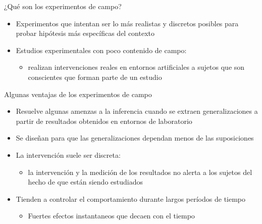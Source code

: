\documentclass[
  ignorenonframetext,
]{beamer}
\providecommand{\tightlist}{%
  \setlength{\itemsep}{0pt}\setlength{\parskip}{0pt}}
\begin{document}
\begin{frame}{¿Qué son los experimentos de campo?}
\protect\hypertarget{quuxe9-son-los-experimentos-de-campo-1}{}
\begin{itemize}
\item
  Experimentos que intentan ser lo más realistas y discretos posibles
  para probar hipótesis más específicas del contexto
\item
  Estudios experimentales con poco contenido de campo:

  \begin{itemize}
  \tightlist
  \item
    realizan intervenciones reales en entornos artificiales a sujetos
    que son conscientes que forman parte de un estudio
  \end{itemize}
\end{itemize}
\end{frame}

\begin{frame}{Algunas ventajas de los experimentos de campo}
\protect\hypertarget{algunas-ventajas-de-los-experimentos-de-campo}{}
\begin{itemize}
\tightlist
\item
  Resuelve algunas amenzas a la inferencia cuando se extraen
  generalizaciones a partir de resultados obtenidos en entornos de
  laboratorio
\item
  Se diseñan para que las generalizaciones dependan menos de las
  suposiciones
\item
  La intervención suele ser discreta:

  \begin{itemize}
  \tightlist
  \item
    la intervención y la medición de los resultados no alerta a los
    sujetos del hecho de que están siendo estudiados
  \end{itemize}
\item
  Tienden a controlar el comportamiento durante largos períodos de
  tiempo

  \begin{itemize}
  \tightlist
  \item
    Fuertes efectos instantaneos que decaen con el tiempo
  \end{itemize}
\end{itemize}
\end{frame}
\end{document}
